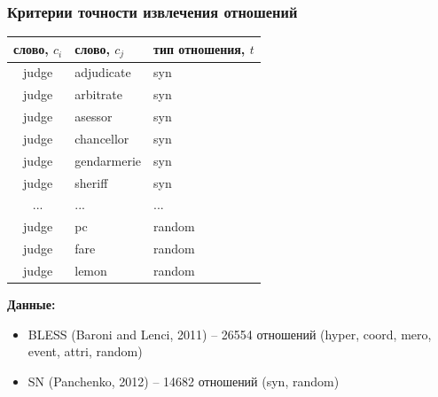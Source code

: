 \documentclass{beamer}
\begin{document}
\begin{frame}
\frametitle{Критерии точности извлечения отношений}

{ \scriptsize

\begin{table}[h]\footnotesize
\begin{tabular}{ |c|l|l| }
\hline
\bf слово, $c_i$ & \bf  слово, $c_j$ & \bf тип отношения, $t$  \\ \hline \hline
judge & adjudicate & syn \\
judge & arbitrate & syn \\
judge & asessor & syn \\
judge & chancellor & syn \\
judge & gendarmerie & syn \\
judge & sheriff & syn \\
... & ... & ...   \\
judge & pc & random \\ 
judge & fare & random \\
judge & lemon & random \\ \hline
\end{tabular}
\end {table}

}

\textbf{Данные:}
\begin{itemize}
  \item BLESS (Baroni and Lenci, 2011)	-- 26554 отношений (hyper, coord, mero, event, attri, random)  
  \item SN (Panchenko, 2012) -- 14682  отношений (syn, random) 
\end{itemize}

\end{frame}
\end{document}
